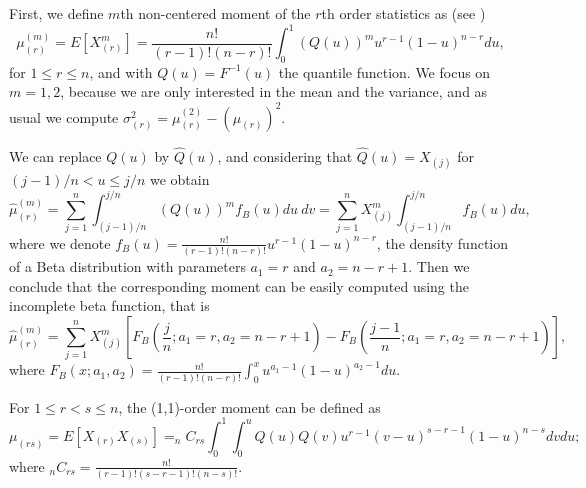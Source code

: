 \documentclass[preprint,12pt]{elsarticle}
\begin{document}
First, we define $m$th non-centered moment of the $r$th order statistics as (see \cite{ABN08})
\begin{equation}\label{mu.r}
\mu_{(r)}^{(m)}=E\left[X_{(r)}^m\right]=\frac{n!}{(r-1)!(n-r)!}\int_0^1(Q(u))^m u^{r-1}(1-u)^{n-r}du,
\end{equation}
for $1\leq r \leq n$, and with $Q(u)=F^{-1}(u)$ the quantile function. We focus on $m=1,2$, because we are only interested in the mean and the variance, and as usual we compute $\sigma_{(r)}^2=\mu_{(r)}^{(2)}-\left(\mu_{(r)}\right)^2$.  
\vskip 0.5cm

We can replace $ Q(u)$ by $\widehat{Q}(u)$, and considering that $\widehat{Q}(u)= X_{(j)}$ for $(j-1)/n < u \leq j/n$ we obtain
\begin{equation}\label{mu.hat}
\widehat{\mu}_{(r)}^{(m)}=\sum_{j=1}^n\int_{(j-1)/n}^{j/n}(Q(u))^m f_B(u)du \ dv=\sum_{j=1}^n X_{(j)}^m\int_{(j-1)/n}^{j/n} f_B(u)du,
\end{equation}
where we denote $f_B(u)=\frac{n!}{(r-1)!(n-r)!} u^{r-1}(1-u)^{n-r}$, the density function of a Beta distribution with parameters $a_1=r$ and $a_2=n-r+1$. Then we conclude that the corresponding moment can be easily computed using the incomplete beta function, that is
\begin{equation}%
\widehat{\mu}_{(r)}^{(m)}=\sum_{j=1}^n X_{(j)}^m\left[F_B\left(\frac{j}{n};a_1=r,a_2=n-r+1\right)-F_B\left(\frac{j-1}{n};a_1=r,a_2=n-r+1\right)\right],
\end{equation}
where $F_B(x;a_1,a_2)=\frac{n!}{(r-1)!(n-r)!}\int_0^x u^{a_1-1}(1-u)^{a_2-1} du$.
\bigskip

For $1 \leq r < s \leq n$, the (1,1)-order moment can be defined as 
\begin{equation}\label{mu.rs}
\mu_{(rs)}=E\left[X_{(r)}X_{(s)}\right]= _nC_{rs} \int_0^1\int_0^{u} Q(u)Q(v) u^{r-1}(v-u)^{s-r-1}(1-u)^{n-s}dvdu;
\end{equation}
where $_nC_{rs}=\frac{n!}{(r-1)!(s-r-1)!(n-s)!}$.
\end{document}
